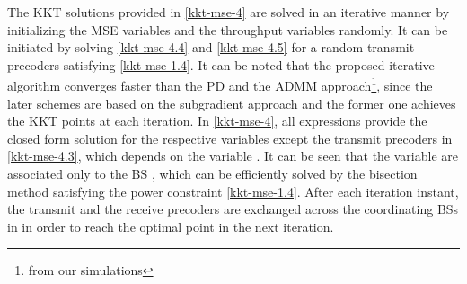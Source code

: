 The \ac{KKT} solutions provided in \eqref{kkt-mse-4} are solved in an iterative manner by initializing the \ac{MSE} variables  and the throughput variables  randomly. It can be initiated by solving \eqref{kkt-mse-4.4} and \eqref{kkt-mse-4.5} for a random transmit precoders  satisfying \eqref{kkt-mse-1.4}. It can be noted that the proposed iterative algorithm converges faster than the \acl{PD} and the \ac{ADMM} approach\footnote{from our simulations}, since the later schemes are based on the subgradient approach and the former one achieves the \ac{KKT} points at each iteration. In \eqref{kkt-mse-4}, all expressions provide the closed form solution for the respective variables except the transmit precoders in \eqref{kkt-mse-4.3}, which depends on the variable . It can be seen that the variable  are associated only to the \ac{BS} , which can be efficiently solved by the bisection method satisfying the power constraint \eqref{kkt-mse-1.4}. After each iteration instant, the transmit and the receive precoders are exchanged across the coordinating \acp{BS} in  in order to reach the optimal point in the next iteration.

